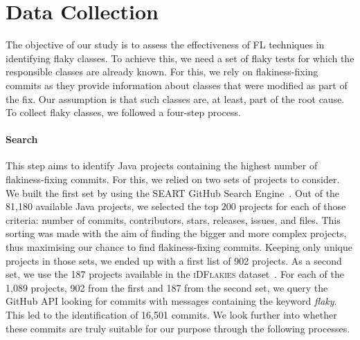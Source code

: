 \section{Data Collection}
\label{sec:sherloc-data}

The objective of our study is to assess the effectiveness of FL techniques in identifying flaky classes.
To achieve this, we need a set of flaky tests for which the responsible classes are already known. 
For this, we rely on flakiness-fixing commits as they provide information about classes that were modified as part of the fix.
Our assumption is that such classes are, at least, part of the root cause. %
To collect flaky classes, we followed a four-step process.

\paragraph{Search} 
This step aims to identify Java projects containing the highest number of flakiness-fixing commits. For this, we relied on two sets of projects to consider. 
We built the first set by using the SEART GitHub Search Engine~\cite{githubsearch}. Out of the 81,180 available Java projects, we selected the top 200 projects for each of those criteria: number of commits, contributors, stars, releases, issues, and files. This sorting was made with the aim of finding the bigger and more complex projects, thus maximising our chance to find flakiness-fixing commits. 
Keeping only unique projects in those sets, we ended up with a first list of 902 projects. As a second set, we use the 187 projects available in the \textsc{iDFlakies} dataset~\cite{Lam2019iDFlakies}. 
For each of the 1,089 projects, 902 from the first and 187 from the second set, we query the GitHub API looking for commits with messages containing the keyword \textit{flaky}. This led to the identification of 16,501 commits.
We look further into whether these commits are truly suitable for our purpose through the following processes. 

\newcommand\mch[2]{\multicolumn{1}{>{\centering\arraybackslash}b{#1}}{#2}}


